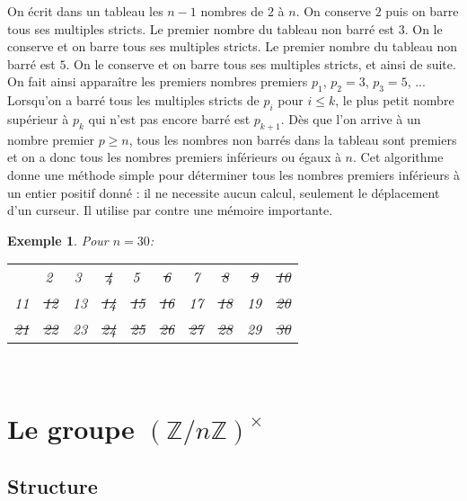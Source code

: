 \documentclass[12pt]{report}
\newtheorem*{ex}{Exemple}
\newtheorem*{prop}{Proposition}
\begin{document}
 On écrit dans un tableau les $n-1$ nombres de $2$ à $n$. On conserve $2$ puis on barre tous ses multiples stricts. Le premier nombre du tableau
non barré est $3$. On le conserve et on barre tous ses multiples stricts. Le premier
nombre du tableau non barré est $5$. On le conserve et on barre tous ses multiples
stricts, et ainsi de suite. On fait ainsi apparaître les premiers nombres premiers
$p_1$, $p_2=3$, $p_3=5$, ...  Lorsqu’on a barré tous les multiples stricts de $p_i$ pour
$i\leq k$, le plus petit nombre supérieur à $p_k$ qui n’est pas encore barré est $p_{k+1}$.
Dès que l’on arrive à un nombre premier $p \geq n$, tous les nombres non barrés dans la tableau sont premiers et on a donc tous les nombres premiers inférieurs ou égaux à $n$.
Cet algorithme donne une méthode simple pour déterminer tous les nombres
premiers inférieurs à un entier positif donné : il ne necessite aucun calcul, seulement le déplacement d'un curseur.  Il utilise par contre une mémoire importante.



\begin{ex}
Pour $n=30$: \\
\begin{tabular}{cccccccccc}
  & \textcircled{2} & \textcircled{3} & \sout{4} & \textcircled{5} & \sout{6} & 7& \sout{8} & \sout{9} & \sout{10}  \\
   11 & \sout{12} & 13 & \sout{14} & \sout{15} & \sout{16} & 17 &\sout{18} & 19 & \sout{20}\\
   \sout{21} & \sout{22} & 23 & \sout{24} & \sout{25} & \sout{26} & \sout{27} & \sout{28} & 29 & \sout{30}
\end{tabular}\\

\end{ex}


\section{Le groupe $(\mathbb{Z}/n\mathbb{Z})^{\times}$}

\subsection{Structure}

\end{document}
